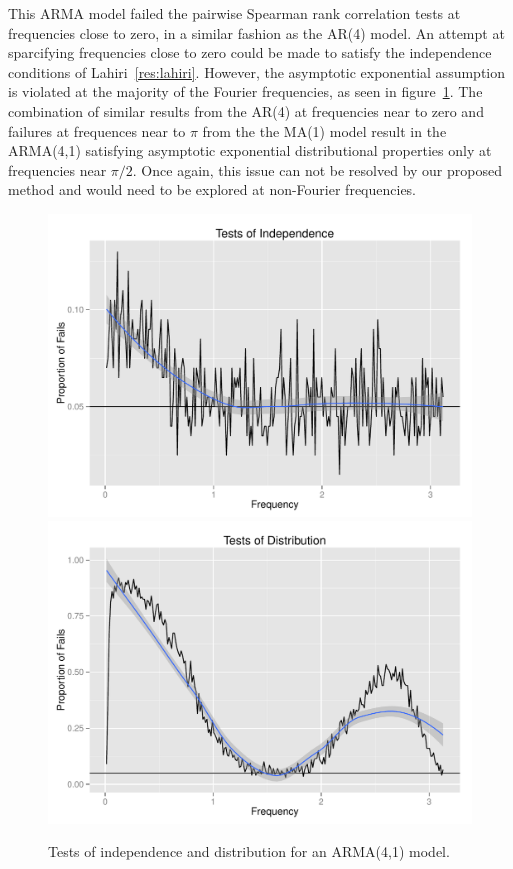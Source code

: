 \documentclass{article}\usepackage{graphicx, color}
\newenvironment{knitrout}{}{} %
\theoremstyle{plain}
\begin{document}
This ARMA model failed the pairwise Spearman rank correlation tests at frequencies close to zero, in a similar fashion as the AR(4) model. An attempt at sparcifying frequencies close to zero could be made to satisfy the independence conditions of Lahiri~\ref{res:lahiri}. However, the asymptotic exponential assumption is violated at the majority of the Fourier frequencies, as seen in figure~\ref{fig:tests-arma41}. The combination of similar results from the AR(4) at frequencies near to zero and failures at frequences near to $\pi$ from the the MA(1) model result in the ARMA(4,1) satisfying asymptotic exponential distributional properties only at frequencies near $\pi/2$. Once again, this issue can not be resolved by our proposed method and would need to be explored at non-Fourier frequencies.

\begin{knitrout}
\color{fgcolor}\begin{figure}[h]

\includegraphics[width=.49\textwidth]{figure/tests-arma411} 
\includegraphics[width=.49\textwidth]{figure/tests-arma412} \caption[Tests of independence and distribution for an ARMA(4,1) model]{Tests of independence and distribution for an ARMA(4,1) model.\label{fig:tests-arma41}}
\end{figure}


\end{knitrout}


% 
\end{document}
